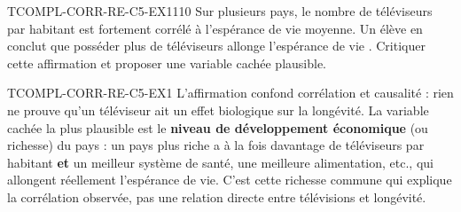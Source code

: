 

\begin{exercice}{TCOMPL-CORR-RE-C5-EX1}{1}{10}
Sur plusieurs pays, le nombre de téléviseurs par habitant est fortement corrélé à l'espérance de vie moyenne. Un élève en conclut que \og posséder plus de téléviseurs allonge l'espérance de vie \fg{}. Critiquer cette affirmation et proposer une variable cachée plausible.
\end{exercice}

\begin{corrige}{TCOMPL-CORR-RE-C5-EX1}
L'affirmation confond corrélation et causalité : rien ne prouve qu'un téléviseur ait un effet biologique sur la longévité. La variable cachée la plus plausible est le \textbf{niveau de développement économique} (ou richesse) du pays : un pays plus riche a à la fois davantage de téléviseurs par habitant \textbf{et} un meilleur système de santé, une meilleure alimentation, etc., qui allongent réellement l'espérance de vie. C'est cette richesse commune qui explique la corrélation observée, pas une relation directe entre télévisions et longévité.
\end{corrige}
